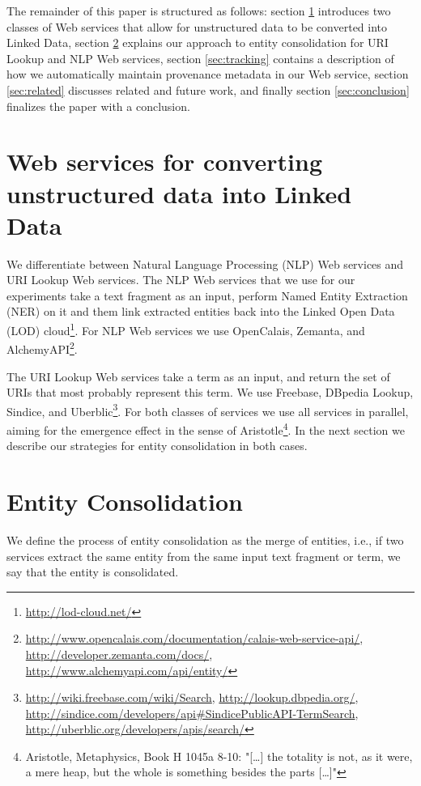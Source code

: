 \documentclass{acm_proc_article-sp}
\begin{document}
The remainder of this paper is structured as follows: section \ref{sec:services} introduces two classes of Web services that allow for unstructured data to be converted into Linked Data, section \ref{sec:consolidation} explains our approach to entity consolidation for URI Lookup and NLP Web services, section \ref{sec:tracking} contains a description of how we automatically maintain provenance metadata in our Web service, section \ref{sec:related} discusses related and future work, and finally section \ref{sec:conclusion} finalizes the paper with a conclusion.

\section{Web services for converting unstructured data into Linked Data}\label{sec:services}
We differentiate between Natural Language Processing (NLP) Web services and URI Lookup Web services. The NLP Web services that we use for our experiments take a text fragment as an input, perform Named Entity Extraction (NER) on it and them link extracted entities back into the Linked Open Data (LOD) cloud\footnote{\url{http://lod-cloud.net/}}. For NLP Web services we use OpenCalais, Zemanta, and AlchemyAPI\footnote{\url{http://www.opencalais.com/documentation/calais-web-service-api/}, \url{http://developer.zemanta.com/docs/}, \url{http://www.alchemyapi.com/api/entity/}}.

The URI Lookup Web services take a term as an input, and return the set of URIs that most probably represent this term. We use Freebase, DBpedia Lookup, Sindice, and Uberblic\footnote{\url{http://wiki.freebase.com/wiki/Search}, \url{http://lookup.dbpedia.org/}, \url{http://sindice.com/developers/api#SindicePublicAPI-TermSearch}, \url{http://uberblic.org/developers/apis/search/}}. For both classes of services we use all services in parallel, aiming for the emergence effect in the sense of Aristotle\footnote{Aristotle, Metaphysics, Book H 1045a 8-10: "[\ldots] the totality is not, as it were, a mere heap, but the whole is something besides the parts [\ldots]"}. In the next section we describe our strategies for entity consolidation in both cases. 

\section{Entity Consolidation}\label{sec:consolidation}
We define the process of entity consolidation as the merge of entities, i.e., if two services extract the same entity from the same input text fragment or term, we say that the entity is consolidated.
\end{document}
